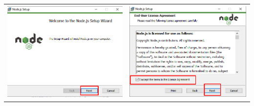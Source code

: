 \begin{enumerate}
\begin{center}
\begin{tabular}{p{6cm} p{6cm}}
\begin{minipage}[c]{6cm}
\includegraphics[width=1\textwidth]{img/node2.png}
\end{minipage}
&  \begin{minipage}[c]{6cm}
\centering
\includegraphics[width=1\textwidth]{img/node3.png}
\end{minipage}
\end{tabular}
\end{center}
  

\end{enumerate}
